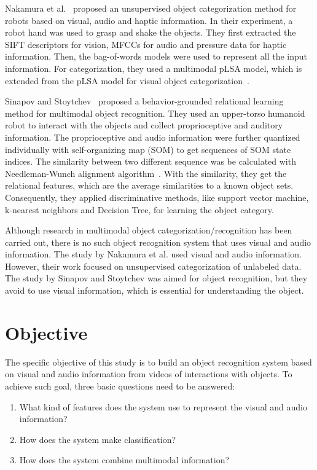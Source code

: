 \documentclass[12pt,final,twoside]{report}
\begin{document}
Nakamura et al.~\cite{nakamura_multimodal_2007} proposed an unsupervised object categorization method for robots based on visual, audio and haptic information. In their experiment, a robot hand was used to grasp and shake the objects. They first extracted the SIFT descriptors for vision, MFCCs for audio and pressure data for haptic information. Then, the bag-of-words models were used to represent all the input information. For categorization, they used a multimodal pLSA model, which is extended from the pLSA model for visual object categorization~\cite{sivic_discovering_2005}.

Sinapov and Stoytchev~\cite{sinapov_object_2011} proposed a behavior-grounded relational learning method for multimodal object recognition. They used an upper-torso humanoid robot to interact with the objects and collect proprioceptive and auditory information. The proprioceptive and audio information were further quantized individually with self-organizing map (SOM) to get sequences of SOM state indices. The similarity between two different sequence was be calculated with Needleman-Wunch alignment algorithm~\cite{needleman_general_1970}. With the similarity, they get the relational features, which are the average similarities to a known object sets. Consequently, they applied discriminative methods, like support vector machine, k-nearest neighbors and Decision Tree, for learning the object category.

Although research in multimodal object categorization/recognition has been carried out, there is no such object recognition system that uses visual and audio information. The study by Nakamura et al. used visual and audio information. However, their work focused on unsupervised categorization of unlabeled data. The study by Sinapov and Stoytchev was aimed for object recognition, but they avoid to use visual information, which is essential for understanding the object.

\section{Objective}
The specific objective of this study is to build an object recognition system based on visual and audio information from videos of interactions with objects. To achieve such goal, three basic questions need to be answered:
\begin{enumerate}
  \item What kind of features does the system use to represent the visual and audio information?
  \item How does the system make classification?
  \item How does the system combine multimodal information? 
\end{enumerate}
\end{document}
